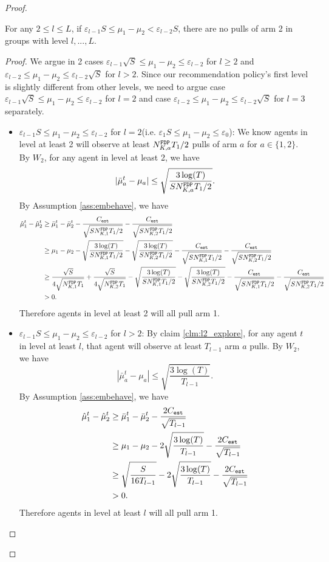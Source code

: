 \begin{proof}
\begin{claim}
\label{clm:l2_exploit}
For any $2 \leq l \leq L$, if $\varepsilon_{l-1} S\leq \mu_1 - \mu_2 < \varepsilon_{l-2} S$, there are no pulls of arm 2 in groups with level $l,...,L$. 
\end{claim}

\begin{proof}
We argue in 2 cases $\varepsilon_{l-1} \sqrt{S} \leq \mu_1 - \mu_2 \leq \varepsilon_{l-2}$ for $l \geq 2$ and $\varepsilon_{l-2}  \leq \mu_1 - \mu_2 \leq \varepsilon_{l-2} \sqrt{S}$ for $l > 2$. Since our recommendation policy's first level is slightly different from other levels, we need to argue case $\varepsilon_{l-1} \sqrt{S} \leq \mu_1 - \mu_2 \leq \varepsilon_{l-2}$ for $l=2$ and case $\varepsilon_{l-2}  \leq \mu_1 - \mu_2 \leq \varepsilon_{l-2} \sqrt{S}$ for $l =3$ separately.

\begin{itemize}
\item $\varepsilon_{l-1} S \leq \mu_1 - \mu_2 \leq \varepsilon_{l-2}$ for $l = 2$(i.e. $\varepsilon_1S\leq \mu_1 - \mu_2 \leq \varepsilon_0$): We know agents in level at least 2 will observe at least $\fdpN T_1/2$ pulls of arm $a$ for $a \in \{1,2\}$. By $W_2$, for any agent in level at least 2, we have
\[
|\bar{\mu}_a^t - \mu_a| \leq \sqrt{\frac{3\log(T)}{S\fdpN T_1/2}}.
\]
By Assumption \ref{ass:embehave}, we have
\begin{align*}
\hat{\mu}_1^t - \hat{\mu}_2^t &\geq \bar{\mu}_1^t - \bar{\mu}_2^t - \frac{\estC}{\sqrt{S\fdpN[1]T_1/2}} -  \frac{\estC}{\sqrt{S\fdpN[2]T_1/2}}\\
&\geq \mu_1 -\mu_2-\sqrt{\frac{3\log(T)}{S\fdpN[1]T_1/2}} - \sqrt{\frac{3\log(T)}{S\fdpN[2]T_1/2}}- \frac{\estC}{\sqrt{S\fdpN[1]T_1/2}} -  \frac{\estC}{\sqrt{S\fdpN[2]T_1/2}}\\
&\geq\frac{\sqrt{S}}{4\sqrt{\fdpN[1]T_1}} +  \frac{\sqrt{S}}{4\sqrt{\fdpN[2]T_1}}-\sqrt{\frac{3\log(T)}{S\fdpN[1]T_1/2}} - \sqrt{\frac{3\log(T)}{S\fdpN[2]T_1/2}}- \frac{\estC}{\sqrt{S\fdpN[1]T_1/2}} -  \frac{\estC}{\sqrt{S\fdpN[2]T_1/2}}\\
&>0.
\end{align*}
Therefore agents in level at least 2 will all pull arm 1. 

\item $\varepsilon_{l-1} S \leq \mu_1 - \mu_2 \leq \varepsilon_{l-2}$ for $l > 2$: By claim \ref{clm:l2_explore}, for any agent $t$ in level at least $l$, that agent will observe at least $T_{l-1}$ arm $a$ pulls. By $W_2$, we have
\[
|\bar{\mu}_a^t - \mu_a| \leq \sqrt{\frac{3\log(T)}{T_{l-1}}}.
\]
By Assumption \ref{ass:embehave}, we have
\begin{align*}
\hat{\mu}_1^t - \hat{\mu}_2^t &\geq \bar{\mu}_1^t - \bar{\mu}_2^t - \frac{2\estC}{\sqrt{T_{l-1}}} \\
&\geq \mu_1 -\mu_2 - 2 \sqrt{\frac{3\log(T)}{T_{l-1}}}- \frac{2\estC}{\sqrt{T_{l-1}}} \\
&\geq\sqrt{\frac{S}{16T_{l-1}}} -  2 \sqrt{\frac{3\log(T)}{T_{l-1}}}- \frac{2\estC}{\sqrt{T_{l-1}}} \\
&>0.
\end{align*}
Therefore agents in level at least $l$ will all pull arm 1. 


\end{itemize}
\end{proof}
\end{proof}
